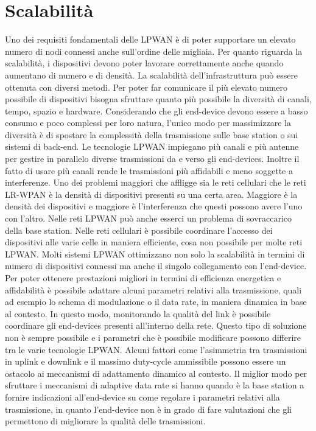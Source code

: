 \documentclass[12pt,a4paper,openright,twoside]{report}
\begin{document}
\section{Scalabilit\`a}
Uno dei requisiti fondamentali delle LPWAN \`e di poter supportare un elevato numero di nodi connessi anche sull'ordine delle migliaia.
Per quanto riguarda la scalabilit\`a, i dispositivi devono poter lavorare correttamente anche quando aumentano di numero e di densit\`a. 
La scalabilit\`a dell'infrastruttura pu\`o essere ottenuta con diversi metodi.
Per poter far comunicare il pi\`u elevato numero possibile di dispositivi bisogna sfruttare quanto pi\`u possibile la diversit\`a di canali, tempo, spazio e hardware.
Considerando che gli end-device devono essere a basso consumo e poco complessi per loro natura, l'unico modo per massimizzare la diversit\`a \`e di spostare la complessit\`a della trasmissione sulle base station o sui sistemi di back-end. 
Le tecnologie LPWAN impiegano pi\`u canali e pi\`u antenne per gestire in parallelo diverse trasmissioni da e verso gli end-devices. 
Inoltre il fatto di usare pi\`u canali rende le trasmissioni pi\`u affidabili e meno soggette a interferenze. 
Uno dei problemi maggiori che affligge sia le reti cellulari che le reti LR-WPAN \`e la densit\`a di dispositivi presenti su una certa area. 
Maggiore \`e la densit\`a dei dispositivi e maggiore \`e l'interferenza che questi possono avere l'uno con l'altro. 
Nelle reti LPWAN pu\`o anche esserci un problema di sovraccarico della base station. 
Nelle reti cellulari \`e possibile coordinare l'accesso dei dispositivi alle varie celle in maniera efficiente, cosa non possibile per molte reti LPWAN.
Molti sistemi LPWAN ottimizzano non solo la scalabilit\`a in termini di numero di dispositivi connessi ma anche il singolo collegamento con l'end-device. Per poter ottenere prestazioni migliori in termini di efficienza energetica e affidabilit\`a \`e possibile adattare alcuni parametri relativi alla trasmissione, quali ad esempio lo schema di modulazione o il data rate, in maniera dinamica in base al contesto. 
In questo modo, monitorando la qualit\`a del link \`e possibile coordinare gli end-devices presenti all'interno della rete. Questo tipo di soluzione non \`e sempre possibile e i parametri che \`e possibile modificare possono differire tra le varie tecnologie LPWAN. 
Alcuni fattori come l'asimmetria tra trasmissioni in uplink e downlink e il massimo duty-cycle ammissibile possono essere un ostacolo ai meccanismi di adattamento dinamico al contesto. 
Il miglior modo per sfruttare i meccanismi di adaptive data rate si hanno quando \`e la base station a fornire indicazioni all'end-device su come regolare i parametri relativi alla trasmissione, in quanto l'end-device non \`e in grado di fare valutazioni che gli permettono di migliorare la qualit\`a delle trasmissioni. 
\end{document}
